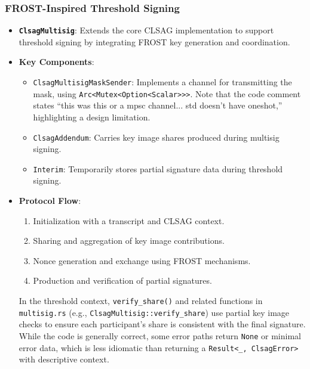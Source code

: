 \documentclass[12pt,a4paper]{article}
\begin{document}
\subsubsection{FROST-Inspired Threshold Signing}
\begin{itemize}
    \item \textbf{\texttt{ClsagMultisig}}: Extends the core CLSAG implementation to support threshold signing by integrating FROST key generation and coordination.

    \item \textbf{Key Components}: 
    \begin{itemize}
        \item \texttt{ClsagMultisigMaskSender}: Implements a channel for transmitting the mask, using \texttt{Arc<Mutex<Option<Scalar>>>}. Note that the code comment states “this was this or a mpsc channel... std doesn't have oneshot,” highlighting a design limitation.

        \item \texttt{ClsagAddendum}: Carries key image shares produced during multisig signing.

        \item \texttt{Interim}: Temporarily stores partial signature data during threshold signing.
    \end{itemize}

    \item \textbf{Protocol Flow}:
    \begin{enumerate}
        \item Initialization with a transcript and CLSAG context.
        \item Sharing and aggregation of key image contributions.
        \item Nonce generation and exchange using FROST mechanisms.
        \item Production and verification of partial signatures.
    \end{enumerate}

    In the threshold context, \texttt{verify\_share()} and related functions in \texttt{multisig.rs} (e.g., \texttt{ClsagMultisig::verify\_share}) use partial key image checks to ensure each participant’s share is consistent with the final signature. While the code is generally correct, some error paths return \texttt{None} or minimal error data, which is less idiomatic than returning a \texttt{Result<\_, ClsagError>} with descriptive context.
\end{itemize}
\end{document}
